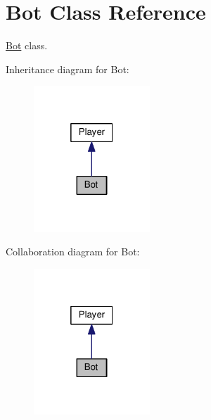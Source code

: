 \hypertarget{classBot}{}\section{Bot Class Reference}
\label{classBot}


\hyperlink{classBot}{Bot} class.  




Inheritance diagram for Bot\+:\nopagebreak
\begin{figure}[H]
\begin{center}
\leavevmode
\includegraphics[width=124pt]{classBot__inherit__graph}
\end{center}
\end{figure}


Collaboration diagram for Bot\+:\nopagebreak
\begin{figure}[H]
\begin{center}
\leavevmode
\includegraphics[width=124pt]{classBot__coll__graph}
\end{center}
\end{figure}
